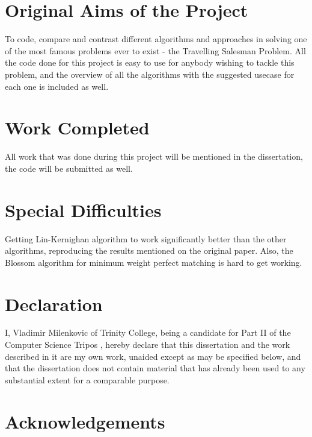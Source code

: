 \documentclass[12pt,twoside,notitlepage]{report}
\begin{document}
\section*{Original Aims of the Project}

To code, compare and contrast different algorithms and approaches in solving one of the most famous problems ever to exist - the Travelling Salesman Problem. All the code done for this project is easy to use for anybody wishing to tackle this problem, and the overview of all the algorithms with the suggested usecase for each one is included as well.


\section*{Work Completed}

All work that was done during this project will be mentioned in the dissertation, the code will be submitted as well.

\section*{Special Difficulties}

Getting Lin-Kernighan algorithm to work significantly better than the other algorithms, reproducing the results mentioned on the original paper. Also, the Blossom algorithm for minimum weight perfect matching is hard to get working. %
 
\newpage
\section*{Declaration}

I, Vladimir Milenkovic of Trinity College, being a candidate for Part II of the Computer
Science Tripos , hereby declare
that this dissertation and the work described in it are my own work,
unaided except as may be specified below, and that the dissertation
does not contain material that has already been used to any substantial
extent for a comparable purpose.

\bigskip
{}

\medskip
{} %

\cleardoublepage

\tableofcontents

\listoffigures

\newpage
\section*{Acknowledgements}
\end{document}
